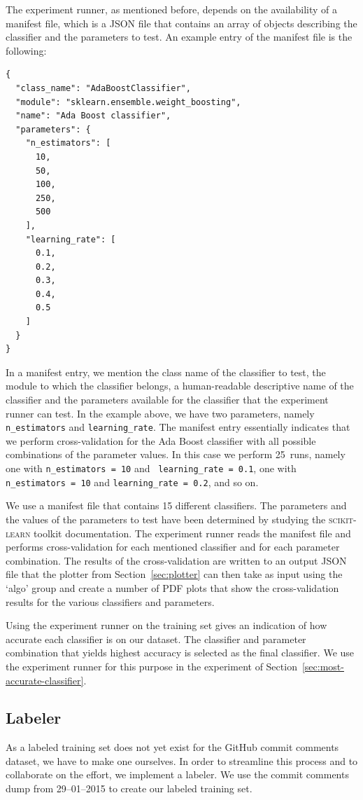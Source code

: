 \documentclass{article}
\begin{document}
The experiment runner, as mentioned before, depends on the availability of
a manifest file, which is a JSON file that contains an array of objects
describing the classifier and the parameters to test. An example entry
of the manifest file is the following:

\begin{verbatim}
{
  "class_name": "AdaBoostClassifier",
  "module": "sklearn.ensemble.weight_boosting",
  "name": "Ada Boost classifier",
  "parameters": {
    "n_estimators": [
      10,
      50,
      100,
      250,
      500
    ],
    "learning_rate": [
      0.1,
      0.2,
      0.3,
      0.4,
      0.5
    ]
  }
}
\end{verbatim}

In a manifest entry, we mention the class name of the classifier to test, the
module to which the classifier belongs, a human-readable descriptive name of 
the classifier and the parameters available for the classifier that the 
experiment runner can test. In the example above, we have two parameters, 
namely {\tt n\_estimators} and {\tt learning\_rate}. The manifest entry 
essentially indicates that we perform cross-validation for the Ada Boost 
classifier with all possible combinations of the parameter values. In this case 
we perform 25~runs, namely one with {\tt n\_estimators = 10} and {\tt 
learning\_rate = 0.1}, one with
{\tt n\_estimators = 10} and {\tt learning\_rate = 0.2}, and so on.

We use a manifest file that contains 15 different classifiers. The
parameters and the values of the parameters to test have been determined by
studying the \textsc{scikit-learn} toolkit documentation. The experiment runner
reads the manifest file and performs cross-validation for each mentioned
classifier and for each parameter combination. The results of the
cross-validation are written to an output JSON file that the plotter from
Section~\ref{sec:plotter} can then take as input using the `algo' group and 
create a number of PDF plots that show the cross-validation results for the 
various classifiers and parameters.

Using the experiment runner on the training set gives an indication of
how accurate each classifier is on our dataset. The classifier and
parameter combination that yields highest accuracy is selected as the final 
classifier. We use the experiment runner for this purpose in the experiment of 
Section~\ref{sec:most-accurate-classifier}.

\subsection{Labeler}\label{sec:labeler}
As a labeled training set does not yet exist for the GitHub commit comments
dataset, we have to make one ourselves. In order to streamline this process
and to collaborate on the effort, we implement a labeler. We use the commit
comments dump from 29--01--2015 to create our labeled training set.
\end{document}
